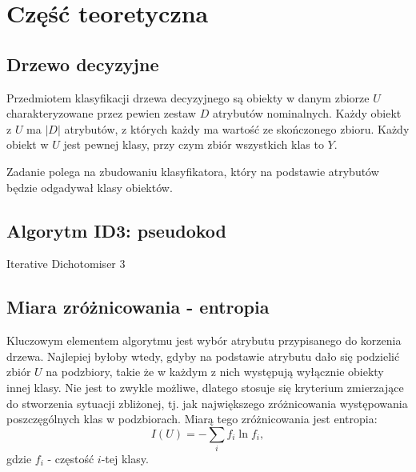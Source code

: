 
\section{Część teoretyczna}
\subsection{Drzewo decyzyjne}
Przedmiotem klasyfikacji drzewa decyzyjnego są obiekty w danym zbiorze $U$
charakteryzowane przez pewien zestaw $D$ atrybutów nominalnych. Każdy obiekt
z $U$ ma $|D|$ atrybutów, z których każdy ma wartość ze skończonego zbioru.
Każdy obiekt w $U$ jest pewnej klasy, przy czym zbiór wszystkich klas to $Y$.

Zadanie polega na zbudowaniu klasyfikatora, który na podstawie atrybutów będzie
odgadywał klasy obiektów.

\subsection{Algorytm ID3: pseudokod}
\IncMargin{1em}
\begin{algorithm}[H]
  \SetAlgoLined
  \DontPrintSemicolon
  \caption{Iterative Dichotomiser 3}\label{ID3}
\end{algorithm}

\subsection{Miara zróżnicowania - entropia}
Kluczowym elementem algorytmu jest wybór atrybutu przypisanego do korzenia
drzewa. Najlepiej byłoby wtedy, gdyby na podstawie atrybutu dało się podzielić
zbiór $U$ na podzbiory, takie że w każdym z nich występują wyłącznie obiekty
innej klasy. Nie jest to zwykle możliwe, dlatego stosuje się kryterium
zmierzające do stworzenia sytuacji zbliżonej, tj. jak największego zróżnicowania
występowania poszczęgólnych klas w podzbiorach. Miarą tego zróżnicowania jest
entropia:
$$I(U) = -\sum_{i}f_i\ln{f_i},$$
gdzie $f_i$ - częstość $i$-tej klasy.

